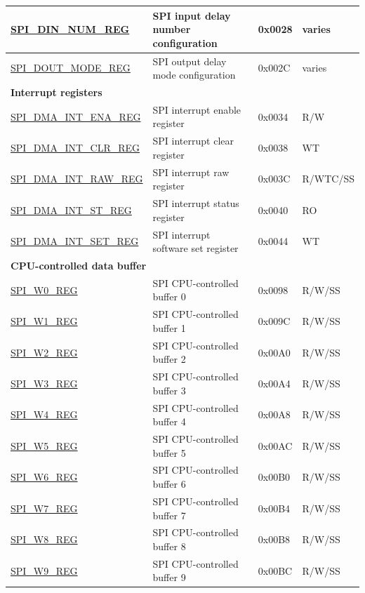 \begin{longtable}{ | p{5.0cm} | p{7.2cm} | p{1.3cm} | p{2.0cm} | }
\hyperref[regdesc:SPIDINNUMREG]{SPI\_DIN\_NUM\_REG} & SPI input delay number configuration & 0x0028 & varies \\ \hline
\hyperref[regdesc:SPIDOUTMODEREG]{SPI\_DOUT\_MODE\_REG} & SPI output delay mode configuration & 0x002C & varies \\ \hline
\multicolumn{4}{|l|}{\textbf{Interrupt registers}} \\ \hline
\hyperref[regdesc:SPIDMAINTENAREG]{SPI\_DMA\_INT\_ENA\_REG} & SPI interrupt enable register & 0x0034 & R/W \\ \hline
\hyperref[regdesc:SPIDMAINTCLRREG]{SPI\_DMA\_INT\_CLR\_REG} & SPI interrupt clear register & 0x0038 & WT \\ \hline
\hyperref[regdesc:SPIDMAINTRAWREG]{SPI\_DMA\_INT\_RAW\_REG} & SPI interrupt raw register & 0x003C & R/WTC/SS \\ \hline
\hyperref[regdesc:SPIDMAINTSTREG]{SPI\_DMA\_INT\_ST\_REG} & SPI interrupt status register & 0x0040 & RO \\ \hline
\hyperref[regdesc:SPIDMAINTSETREG]{SPI\_DMA\_INT\_SET\_REG} & SPI interrupt software set register & 0x0044 & WT \\ \hline
\multicolumn{4}{|l|}{\textbf{CPU-controlled data buffer}} \\ \hline
\hyperref[regdesc:SPIW0REG]{SPI\_W0\_REG} & SPI CPU-controlled buffer  0 & 0x0098 & R/W/SS \\ \hline
\hyperref[regdesc:SPIW1REG]{SPI\_W1\_REG} & SPI CPU-controlled buffer  1 & 0x009C & R/W/SS \\ \hline
\hyperref[regdesc:SPIW2REG]{SPI\_W2\_REG} & SPI CPU-controlled buffer  2 & 0x00A0 & R/W/SS \\ \hline
\hyperref[regdesc:SPIW3REG]{SPI\_W3\_REG} & SPI CPU-controlled buffer  3 & 0x00A4 & R/W/SS \\ \hline
\hyperref[regdesc:SPIW4REG]{SPI\_W4\_REG} & SPI CPU-controlled buffer  4 & 0x00A8 & R/W/SS \\ \hline
\hyperref[regdesc:SPIW5REG]{SPI\_W5\_REG} & SPI CPU-controlled buffer  5 & 0x00AC & R/W/SS \\ \hline
\hyperref[regdesc:SPIW6REG]{SPI\_W6\_REG} & SPI CPU-controlled buffer  6 & 0x00B0 & R/W/SS \\ \hline
\hyperref[regdesc:SPIW7REG]{SPI\_W7\_REG} & SPI CPU-controlled buffer  7 & 0x00B4 & R/W/SS \\ \hline
\hyperref[regdesc:SPIW8REG]{SPI\_W8\_REG} & SPI CPU-controlled buffer  8 & 0x00B8 & R/W/SS \\ \hline
\hyperref[regdesc:SPIW9REG]{SPI\_W9\_REG} & SPI CPU-controlled buffer  9 & 0x00BC & R/W/SS \\ \hline

\end{longtable}
